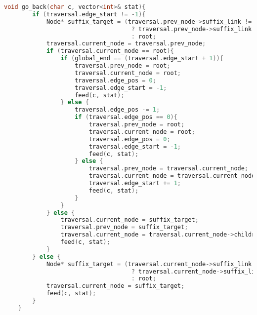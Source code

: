 \begin{lstlisting}[language=C++]
    void go_back(char c, vector<int>& stat){
        if (traversal.edge_start != -1){
            Node* suffix_target = (traversal.prev_node->suffix_link != nullptr) 
                                    ? traversal.prev_node->suffix_link 
                                    : root;
            traversal.current_node = traversal.prev_node;
            if (traversal.current_node == root){
                if (global_end == (traversal.edge_start + 1)){
                    traversal.prev_node = root;
                    traversal.current_node = root;
                    traversal.edge_pos = 0;
                    traversal.edge_start = -1;
                    feed(c, stat);
                } else {
                    traversal.edge_pos -= 1;
                    if (traversal.edge_pos == 0){
                        traversal.prev_node = root;
                        traversal.current_node = root;
                        traversal.edge_pos = 0;
                        traversal.edge_start = -1;
                        feed(c, stat);
                    } else {
                        traversal.prev_node = traversal.current_node;
                        traversal.current_node = traversal.current_node->children[text[traversal.edge_start + 1]];
                        traversal.edge_start += 1;
                        feed(c, stat);
                    }
                }
            } else {
                traversal.current_node = suffix_target;
                traversal.prev_node = suffix_target;
                traversal.current_node = traversal.current_node->children[text[traversal.edge_start]];
                feed(c, stat);
            }
        } else {
            Node* suffix_target = (traversal.current_node->suffix_link != nullptr) 
                                    ? traversal.current_node->suffix_link 
                                    : root;
            traversal.current_node = suffix_target;
            feed(c, stat);
        }
    }


\end{lstlisting}
